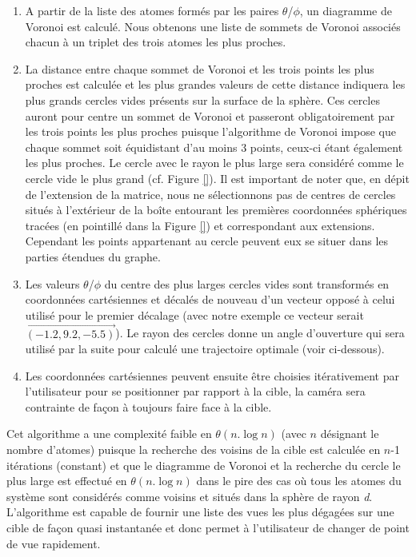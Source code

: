 \begin{enumerate}
	\item A partir de la liste des atomes formés par les paires $\theta$/$\phi$, un diagramme de Voronoi est calculé. Nous obtenons une liste de sommets de Voronoi associés chacun à un triplet des trois atomes les plus proches.
	\item La distance entre chaque sommet de Voronoi et les trois points les plus proches est calculée et les plus grandes valeurs de cette distance indiquera les plus grands cercles vides présents sur la surface de la sphère. Ces cercles auront pour centre un sommet de Voronoi et passeront obligatoirement par les trois points les plus proches puisque l'algorithme de Voronoi impose que chaque sommet soit équidistant d'au moins 3 points, ceux-ci étant également les plus proches. Le cercle avec le rayon le plus large sera considéré comme le cercle vide le plus grand (cf. Figure \ref{}). Il est important de noter que, en dépit de l'extension de la matrice, nous ne sélectionnons pas de centres de cercles situés à l'extérieur de la boîte entourant les premières coordonnées sphériques tracées (en pointillé dans la Figure \ref{}) et correspondant aux extensions. Cependant les points appartenant au cercle peuvent eux se situer dans les parties étendues du graphe.
	\item Les valeurs $\theta$/$\phi$ du centre des plus larges cercles vides sont transformés en coordonnées cartésiennes et décalés de nouveau d'un vecteur opposé à celui utilisé pour le premier décalage (avec notre exemple ce vecteur serait $\overrightarrow{(-1.2,9.2,-5.5)}$). Le rayon des cercles donne un angle d'ouverture qui sera utilisé par la suite pour calculé une trajectoire optimale (voir ci-dessous).
	\item Les coordonnées cartésiennes peuvent ensuite être choisies itérativement par l'utilisateur pour se positionner par rapport à la cible, la caméra sera contrainte de façon à toujours faire face à la cible.
\end{enumerate}

Cet algorithme a une complexité faible en $\theta(n.\log{n})$ (avec $n$ désignant le nombre d'atomes) puisque la recherche des voisins de la cible est calculée en $n$-1 itérations (constant) et que le diagramme de Voronoi et la recherche du cercle le plus large est effectué en $\theta(n.\log{n})$ dans le pire des cas où tous les atomes du système sont considérés comme voisins et situés dans la sphère de rayon \textit{d}. L'algorithme est capable de fournir une liste des vues les plus dégagées sur une cible de façon quasi instantanée et donc permet à l'utilisateur de changer de point de vue rapidement.

